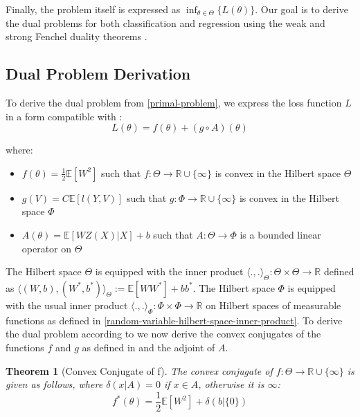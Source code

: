 \documentclass{article}
\newtheorem{theorem}{Theorem}
\begin{document}
Finally, the problem itself is expressed as $\inf_{\theta \in \Theta}\{L(\theta)\}$. Our goal is to derive the dual problems for both classification and regression using the weak and strong Fenchel duality theorems \cite[Theorem 4.4.2 \& 4.4.3]{Borwein2005-ky}.

\subsection{Dual Problem Derivation}

To derive the dual problem from \ref{primal-problem}, we express the loss function $L$ in a form compatible with \cite[Theorem 4.4.2]{Borwein2005-ky}: 
\begin{equation}
L(\theta) = f(\theta) + (g \circ A)(\theta)
\end{equation}

where: 
\begin{itemize}
 \item $f(\theta) = \frac{1}{2} \mathbb{E}[W^2]$ such that $f : \Theta \rightarrow \mathbb{R} \cup \{\infty\}$ is convex in the Hilbert space $\Theta$
 \item $g(V) = C \mathbb{E}[l(Y , V)]$ such that $g : \Phi \rightarrow \mathbb{R} \cup \{ \infty\}$ is convex in the Hilbert space $\Phi$
 \item $A(\theta) = \mathbb{E}[W Z(X)| X] + b$ such that $A : \Theta \rightarrow \Phi$ is a bounded linear operator on $\Theta$
\end{itemize}
The Hilbert space $\Theta$ is equipped with the inner product $\langle . , . \rangle_{\Theta} : \Theta \times \Theta \rightarrow \mathbb{R}$ defined as $\langle \left(W , b\right), \left(W^{*} , b^{*}\right) \rangle_{\Theta} := \mathbb{E}\left[W W^{*}\right] + b b^{*}$. The Hilbert space $\Phi$ is equipped with the usual inner product $\langle . , . \rangle_{\Phi} : \Phi \times \Phi \rightarrow \mathbb{R}$ on Hilbert spaces of measurable functions as defined in \ref{random-variable-hilbert-space-inner-product}. To derive the dual problem according to \cite[Theorem 4.4.2]{Borwein2005-ky} we now derive the convex conjugates of the functions $f$ and $g$ as defined in \cite[Section 4.4.1]{Borwein2005-ky} and the adjoint of $A$.

\begin{theorem}[Convex Conjugate of f]\label{thm:convex-conj-F}
The convex conjugate of $f :\Theta \rightarrow \mathbb{R} \cup \{ \infty \}$ is given as follows, where $\delta(x | A) = 0$ if $x \in A$, otherwise it is $\infty$: 
\begin{equation}
f^{*}(\theta) = \frac{1}{2}\mathbb{E}[W^2] + \delta(b|\{0\})
\end{equation} 
\end{theorem}
\end{document}
